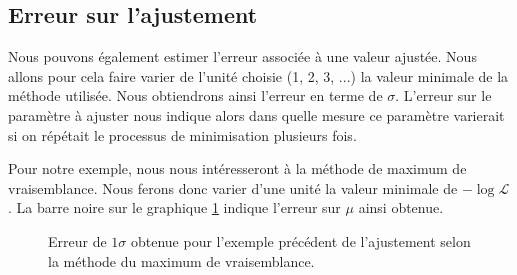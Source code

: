 \subsection{Erreur sur l'ajustement}
Nous pouvons également estimer l'erreur associée à une valeur ajustée. Nous allons pour cela faire varier de l'unité choisie (1, 2, 3, ...) la valeur minimale de la méthode utilisée. Nous obtiendrons ainsi l'erreur en terme de $\sigma$. L'erreur sur le paramètre à ajuster nous indique alors dans quelle mesure ce paramètre varierait si on répétait le processus de minimisation plusieurs fois.

Pour notre exemple, nous nous intéresseront à la méthode de maximum de vraisemblance. Nous ferons donc varier d'une unité la valeur minimale de  $-\log{\mathcal{L}}$. La barre noire sur le graphique \ref{fig:error} indique l'erreur sur $\mu$ ainsi obtenue.


\begin{figure}[h!]
\caption{Erreur de $1\sigma$ obtenue pour l'exemple précédent de l'ajustement selon la méthode du maximum de vraisemblance.}
\label{fig:error}
\end{figure}




